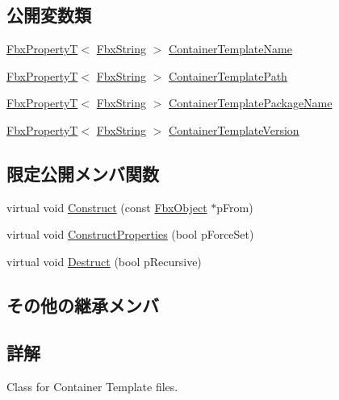 \subsection*{公開変数類}
\begin{DoxyCompactItemize}
\item 
\hyperlink{class_fbx_property_t}{Fbx\+PropertyT}$<$ \hyperlink{class_fbx_string}{Fbx\+String} $>$ \hyperlink{class_fbx_container_template_ae30cc6c47849ef02f82707c8691df636}{Container\+Template\+Name}
\item 
\hyperlink{class_fbx_property_t}{Fbx\+PropertyT}$<$ \hyperlink{class_fbx_string}{Fbx\+String} $>$ \hyperlink{class_fbx_container_template_a6377f5a818df77faf04a001ae7a22cca}{Container\+Template\+Path}
\item 
\hyperlink{class_fbx_property_t}{Fbx\+PropertyT}$<$ \hyperlink{class_fbx_string}{Fbx\+String} $>$ \hyperlink{class_fbx_container_template_a6f0973e4624ac59f1c0af9e172f224c1}{Container\+Template\+Package\+Name}
\item 
\hyperlink{class_fbx_property_t}{Fbx\+PropertyT}$<$ \hyperlink{class_fbx_string}{Fbx\+String} $>$ \hyperlink{class_fbx_container_template_ac2029d97e3946bc2a62f2a673a1981c0}{Container\+Template\+Version}
\end{DoxyCompactItemize}
\subsection*{限定公開メンバ関数}
\begin{DoxyCompactItemize}
\item 
virtual void \hyperlink{class_fbx_container_template_a141e84991e5620dc97e8b77f52e019ae}{Construct} (const \hyperlink{class_fbx_object}{Fbx\+Object} $\ast$p\+From)
\item 
virtual void \hyperlink{class_fbx_container_template_ae43300ebc308b87a6aae824daff21158}{Construct\+Properties} (bool p\+Force\+Set)
\item 
virtual void \hyperlink{class_fbx_container_template_a0a99e57b3db934418c1a45b0a35055d7}{Destruct} (bool p\+Recursive)
\end{DoxyCompactItemize}
\subsection*{その他の継承メンバ}


\subsection{詳解}
Class for Container Template files. 


